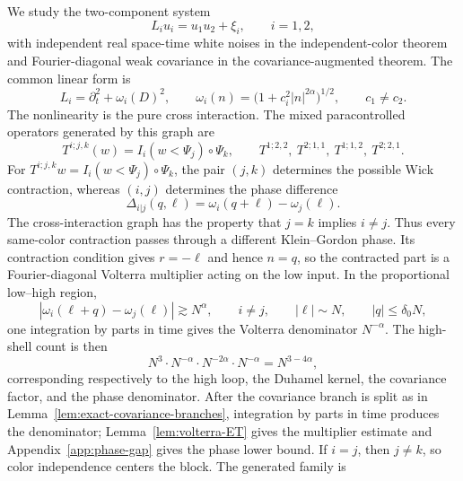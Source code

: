 \documentclass[10pt]{amsart}
\numberwithin{equation}{section}
\theoremstyle{plain}
\theoremstyle{definition}
\theoremstyle{remark}
\begin{document}
We study the two-component system
\begin{equation}\label{eq:main-system-intro}
        L_i u_i=u_1u_2+\xi_i,\qquad i=1,2,
\end{equation}
with independent real space-time white noises in the independent-color theorem and Fourier-diagonal weak covariance in the covariance-augmented theorem.  The common linear form is
\begin{equation}\label{eq:omega-intro}
        L_i=\partial_t^2+\omega_i(D)^2,
        \qquad
        \omega_i(n)=\bigl(1+c_i^2|n|^{2\alpha}\bigr)^{1/2},
        \qquad c_1\ne c_2.
\end{equation}
The nonlinearity is the pure cross interaction.  The mixed paracontrolled operators generated by this graph are
\[
        T^{i;j,k}(w)=I_i(w<\Psi_j)\circ\Psi_k,
        \qquad
        T^{1;2,2},\ T^{2;1,1},\ T^{1;1,2},\ T^{2;2,1}.
\]
For \(T^{i;j,k}w=I_i(w<\Psi_j)\circ\Psi_k\), the pair \((j,k)\) determines the possible Wick contraction, whereas \((i,j)\) determines the phase difference
\begin{equation}\label{eq:intro-color-phase-denominator}
        \Delta_{i|j}(q,\ell)=\omega_i(q+\ell)-\omega_j(\ell).
\end{equation}
The cross-interaction graph has the property that \(j=k\) implies \(i\ne j\).  Thus every same-color contraction passes through a different Klein--Gordon phase.  Its contraction condition gives $r=-\ell$ and hence $n=q$, so the contracted part is a Fourier-diagonal Volterra multiplier acting on the low input.  In the proportional low--high region,
\begin{equation}\label{eq:intro-speed-gap}
        |\omega_i(\ell+q)-\omega_j(\ell)|\gtrsim N^\alpha,
        \qquad i\ne j,
        \qquad |\ell|\sim N,
        \qquad |q|\le \delta_0N,
\end{equation}
one integration by parts in time gives the Volterra denominator $N^{-\alpha}$.  The high-shell count is then
\begin{equation}\label{eq:intro-diagonal-count}
        N^3\cdot N^{-\alpha}\cdot N^{-2\alpha}\cdot N^{-\alpha}=N^{3-4\alpha},
\end{equation}
corresponding respectively to the high loop, the Duhamel kernel, the covariance factor, and the phase denominator.  After the covariance branch is split as in Lemma~\ref{lem:exact-covariance-branches}, integration by parts in time produces the denominator; Lemma~\ref{lem:volterra-ET} gives the multiplier estimate and Appendix~\ref{app:phase-gap} gives the phase lower bound.  If \(i=j\), then \(j\ne k\), so color independence centers the block.  The generated family is
\end{document}
